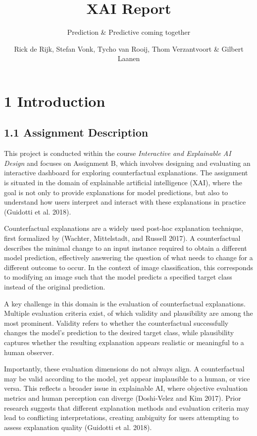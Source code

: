 \documentclass[
  letterpaper,
  DIV=11,
  numbers=noendperiod]{scrartcl}
\title{XAI Report}
\subtitle{Prediction \& Predictive coming together}
\author{Rick de Rijk, Stefan Vonk, Tycho van Rooij, Thom Verzantvoort \&
Gilbert Laanen}
\date{}
\renewcommand*\contentsname{Table of contents}
\newcommand\contentsname{Table of contents}
\begin{document}
\maketitle

\renewcommand*\contentsname{Table of contents}
{
\hypersetup{linkcolor=}
\setcounter{tocdepth}{3}
\tableofcontents
}
\listoffigures

\section{1 Introduction}\label{introduction}

\subsection{1.1 Assignment Description}\label{assignment-description}

This project is conducted within the course \emph{Interactive and
Explainable AI Design} and focuses on Assignment B, which involves
designing and evaluating an interactive dashboard for exploring
counterfactual explanations. The assignment is situated in the domain of
explainable artificial intelligence (XAI), where the goal is not only to
provide explanations for model predictions, but also to understand how
users interpret and interact with these explanations in practice
(Guidotti et al. 2018).

Counterfactual explanations are a widely used post-hoc explanation
technique, first formalized by (Wachter, Mittelstadt, and Russell 2017).
A counterfactual describes the minimal change to an input instance
required to obtain a different model prediction, effectively answering
the question of what needs to change for a different outcome to occur.
In the context of image classification, this corresponds to modifying an
image such that the model predicts a specified target class instead of
the original prediction.

A key challenge in this domain is the evaluation of counterfactual
explanations. Multiple evaluation criteria exist, of which validity and
plausibility are among the most prominent. Validity refers to whether
the counterfactual successfully changes the model's prediction to the
desired target class, while plausibility captures whether the resulting
explanation appears realistic or meaningful to a human observer.

Importantly, these evaluation dimensions do not always align. A
counterfactual may be valid according to the model, yet appear
implausible to a human, or vice versa. This reflects a broader issue in
explainable AI, where objective evaluation metrics and human perception
can diverge (Doshi-Velez and Kim 2017). Prior research suggests that
different explanation methods and evaluation criteria may lead to
conflicting interpretations, creating ambiguity for users attempting to
assess explanation quality (Guidotti et al. 2018).
\end{document}
